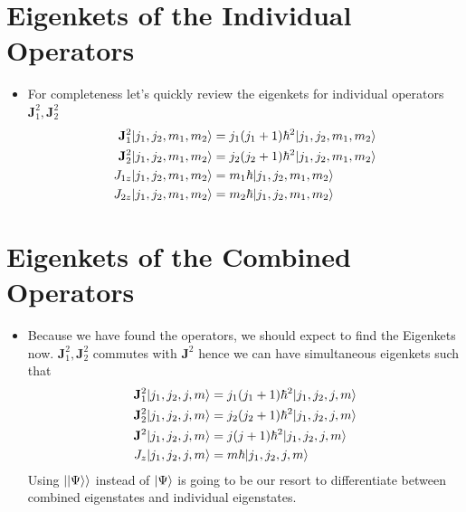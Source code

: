 \documentclass[11pt]{article}
\newcommand{\hb}{\hbar}
\renewcommand{\vec}{\mathbf}
\begin{document}
{\section*{Eigenkets of the Individual Operators}
\begin{itemize}
	\item For completeness let's quickly review the eigenkets for individual operators $\vec{J}_1^2, \vec{J}_2^2$ 
		\begin{align*}
		\vec{J}_1 ^2 \ket{j_1, j_2 , m_1 , m_2} &= j_1(j_1 + 1) \hb^2 \ket{j_1 , j_2 , m_1 , m_2} \\
		\vec{J}_2 ^2 \ket{j_1, j_2 , m_1 , m_2} &= j_2(j_2 + 1) \hb^2 \ket{j_1 , j_2 , m_1 , m_2} \\
		J_{1z} \ket{j_1, j_2 , m_1 , m_2 } &= m_1 \hb \ket{j_1, j_2 , m_1 , m_2 } \\
		J_{2z} \ket{j_1, j_2 , m_1 , m_2 } &= m_2 \hb \ket{j_1, j_2 , m_1 , m_2 } \\
		\end{align*}
\end{itemize}









	\section*{Eigenkets of the Combined Operators}
\begin{itemize}
\item Because we have found the operators, we should expect to find the Eigenkets now. $\vec{J}_1^2, \vec{J}_2^2$ commutes with $\vec{J}^2$ hence we can have simultaneous eigenkets such that 
	\begin{align}
		\vec{J}_1 ^2 \ket{j_1, j_2 , j , m} &= j_1(j_1 + 1) \hb^2 \ket{j_1 , j_2 , j , m} \\
		\vec{J}_2 ^2 \ket{j_1, j_2 , j , m} &= j_2(j_2 + 1) \hb^2 \ket{j_1 , j_2 , j , m} \\
		\vec{J} ^2 \ket{j_1, j_2 , j , m} &= j(j + 1) \hb^2 \ket{j_1 , j_2 , j , m} \\
		J_z  \ket{j_1, j_2 , j , m} &= m \hb \ket{j_1 , j_2 , j , m} 
	\end{align}
	Using $\lvert\lvert\Psi\rangle\rangle$ instead of $\lvert\Psi\rangle$ is going to be our resort to differentiate between combined eigenstates and individual eigenstates.
\end{itemize}











}
\end{document}
